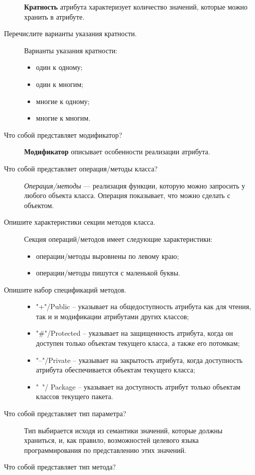\begin{description}
		\textbf{Кратность} атрибута характеризует количество значений,
		которые можно хранить в атрибуте.
	\item [Перечислите варианты указания кратности.]
		Варианты указания кратности:
		\begin{itemize}
			\item один к одному;
			\item один к многим;
			\item многие к одному;
			\item многие к многим.
		\end{itemize}
	\item [Что собой представляет модификатор?]
		\textbf{Модификатор} описывает особенности реализации атрибута.
	\item [Что собой представляет операция/методы класса?]
		\textit{Операция/методы} --- реализация функции, которую можно
		запросить у любого объекта класса. Операция показывает,
		что можно сделать с объектом.
	\item [Опишите характеристики секции методов класса.]
		Секция операций/методов имеет следующие характеристики:
		\begin{itemize}
			\item операции/методы выровнены по левому краю;
			\item операции/методы пишутся с маленькой буквы.
		\end{itemize}
	\item [Опишите набор спецификаций методов.]
		\begin{itemize}
			\item "+"/Public – указывает на общедоступность атрибута
				как для чтения, так и и модификации атрибутами других классов;
			\item "\#"/Protected – указывает на защищенность атрибута,
				когда он доступен только объектам текущего класса,
				а также его потомкам;
			\item "–"/Private – указывает на закрытость атрибута,
				когда доступность атрибута обеспечивается объектам текущего
				класса;
			\item "~"/ Package – указывает на доступность атрибут только
				объектам классов текущего пакета.
		\end{itemize}
	\item [Что собой представляет тип параметра?]
		Тип выбирается исходя из семантики значений, которые должны
		храниться, и, как правило, возможностей
		целевого языка программирования по представлению этих значений.
	\item [Что собой представляет тип метода?]

\end{description}
